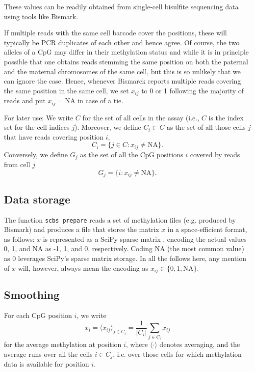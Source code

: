 \documentclass[twocolumn,10pt]{article}
\begin{document}
These values can be readily obtained from single-cell bisulfite sequencing data using tools like Bismark.

If multiple reads with the same cell barcode cover the positions, these will typically be PCR duplicates of each other and hence agree. Of course, the two alleles of a CpG may differ in their methylation status and while it is in principle possible that one obtains reads stemming the same position on both the paternal and the maternal chromosomes of the same cell, but this is so unlikely that we can ignore the case. Hence, whenever Bismarck reports multiple reads covering the same position in the same cell, we set $x_{ij}$ to 0 or 1 following the majority of reads and put $x_{ij}=\text{NA}$ in case of a tie. 

For later use: We write $C$ for the set of all cells in the assay (i.e., $C$ is the index set for the cell indices $j$). Moreover,
we define $C_i\subset C$ as the set of all those cells $j$ that have reads covering position $i$,
$$ C_i=\{j\in C: x_{ij}\neq\text{NA}\}.$$
Conversely, we define $G_j$ as the set of all the CpG positions $i$ covered by reads from cell $j$ 
$$ G_j=\{i: x_{ij}\neq\text{NA}\}.$$

\subsection{Data storage}

The function \texttt{scbs prepare} reads a set of methylation files (e.g. produced by Bismark) and produces a file that stores the matrix $x$ in a space-efficient format, as follows: $x$ is represented as a SciPy sparse matrix \citep{SciPy}, encoding the actual values 0, 1, and NA as -1, 1, and 0, respectively. Coding NA (the most common value) as 0 leverages SciPy's sparse matrix storage. In all the follows here, any mention of $x$ will, however, always mean the encoding as $x_{ij}\in\{0,1,\text{NA}\}$.

\subsection{Smoothing}

For each CpG position $i$, we write 
$$\overline{x}_i=\langle x_{ij} \rangle_{j\in C_i} = \frac{1}{|C_i|}\sum_{j\in C_i} x_{ij}$$ 
for the average methylation at position $i$, where $\langle\cdot\rangle$ denotes averaging, and the average runs over all the cells $i\in C_j$, i.e. over those cells for which methylation data is available for position $i$.
\end{document}
